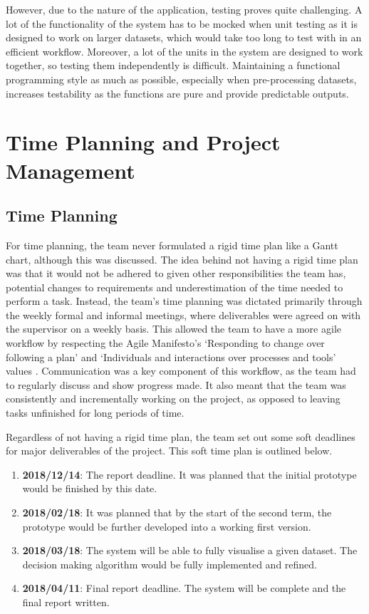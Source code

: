 \documentclass[a4paper,titlepage]{article}
\begin{document}
However, due to the nature of the application, testing proves quite challenging. 
A lot of the functionality of the system has to be mocked when unit testing as it is designed to work on larger datasets, which would take too long to test with in an efficient workflow. 
Moreover, a lot of the units in the system are designed to work together, so testing them independently is difficult. 
Maintaining a functional programming style as much as possible, especially when pre-processing datasets, increases testability as the functions are pure and provide predictable outputs.

\section{Time Planning and Project Management}
\subsection{Time Planning\label{timeplanning}}
For time planning, the team never formulated a rigid time plan like a Gantt chart, although this was discussed. 
The idea behind not having a rigid time plan was that it would not be adhered to given other responsibilities the team has, potential changes to requirements and underestimation of the time needed to perform a task. 
Instead, the team's time planning was dictated primarily through the weekly formal and informal meetings, where deliverables were agreed on with the supervisor on a weekly basis. 
This allowed the team to have a more agile workflow by respecting the Agile Manifesto's `Responding to change over following a plan' and `Individuals and interactions over processes and tools' values \cite{agilemanifesto}. 
Communication was a key component of this workflow, as the team had to regularly discuss and show progress made. 
It also meant that the team was consistently and incrementally working on the project, as opposed to leaving tasks unfinished for long periods of time.

Regardless of not having a rigid time plan, the team set out some soft deadlines for major deliverables of the project.
This soft time plan is outlined below.

\begin{enumerate}
  \item \textbf{2018/12/14}: The report deadline. It was planned that the initial prototype would be finished by this date.
  \item \textbf{2018/02/18}: It was planned that by the start of the second term, the prototype would be further developed into a working first version.
  \item \textbf{2018/03/18}: The system will be able to fully visualise a given dataset. The decision making algorithm would be fully implemented and refined.
  \item \textbf{2018/04/11}: Final report deadline. The system will be complete and the final report written.
\end{enumerate}
\end{document}
